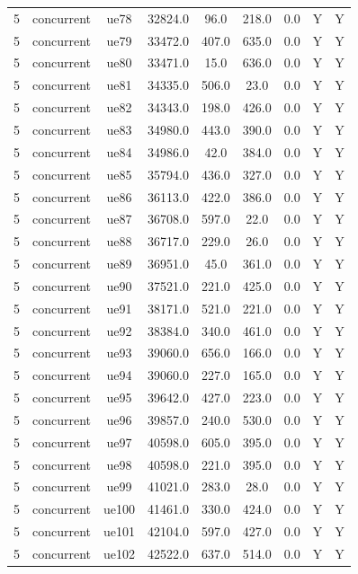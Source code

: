 \begin{table}[ht]
\begin{tabular}{|c|c|c|c|c|c|c|c|c|}
5 & concurrent & ue78 & 32824.0 & 96.0 & 218.0 & 0.0 & Y & Y \\
5 & concurrent & ue79 & 33472.0 & 407.0 & 635.0 & 0.0 & Y & Y \\
5 & concurrent & ue80 & 33471.0 & 15.0 & 636.0 & 0.0 & Y & Y \\
5 & concurrent & ue81 & 34335.0 & 506.0 & 23.0 & 0.0 & Y & Y \\
5 & concurrent & ue82 & 34343.0 & 198.0 & 426.0 & 0.0 & Y & Y \\
5 & concurrent & ue83 & 34980.0 & 443.0 & 390.0 & 0.0 & Y & Y \\
5 & concurrent & ue84 & 34986.0 & 42.0 & 384.0 & 0.0 & Y & Y \\
5 & concurrent & ue85 & 35794.0 & 436.0 & 327.0 & 0.0 & Y & Y \\
5 & concurrent & ue86 & 36113.0 & 422.0 & 386.0 & 0.0 & Y & Y \\
5 & concurrent & ue87 & 36708.0 & 597.0 & 22.0 & 0.0 & Y & Y \\
5 & concurrent & ue88 & 36717.0 & 229.0 & 26.0 & 0.0 & Y & Y \\
5 & concurrent & ue89 & 36951.0 & 45.0 & 361.0 & 0.0 & Y & Y \\
5 & concurrent & ue90 & 37521.0 & 221.0 & 425.0 & 0.0 & Y & Y \\
5 & concurrent & ue91 & 38171.0 & 521.0 & 221.0 & 0.0 & Y & Y \\
5 & concurrent & ue92 & 38384.0 & 340.0 & 461.0 & 0.0 & Y & Y \\
5 & concurrent & ue93 & 39060.0 & 656.0 & 166.0 & 0.0 & Y & Y \\
5 & concurrent & ue94 & 39060.0 & 227.0 & 165.0 & 0.0 & Y & Y \\
5 & concurrent & ue95 & 39642.0 & 427.0 & 223.0 & 0.0 & Y & Y \\
5 & concurrent & ue96 & 39857.0 & 240.0 & 530.0 & 0.0 & Y & Y \\
5 & concurrent & ue97 & 40598.0 & 605.0 & 395.0 & 0.0 & Y & Y \\
5 & concurrent & ue98 & 40598.0 & 221.0 & 395.0 & 0.0 & Y & Y \\
5 & concurrent & ue99 & 41021.0 & 283.0 & 28.0 & 0.0 & Y & Y \\
5 & concurrent & ue100 & 41461.0 & 330.0 & 424.0 & 0.0 & Y & Y \\
5 & concurrent & ue101 & 42104.0 & 597.0 & 427.0 & 0.0 & Y & Y \\
5 & concurrent & ue102 & 42522.0 & 637.0 & 514.0 & 0.0 & Y & Y \\

\end{tabular}
\end{table}
